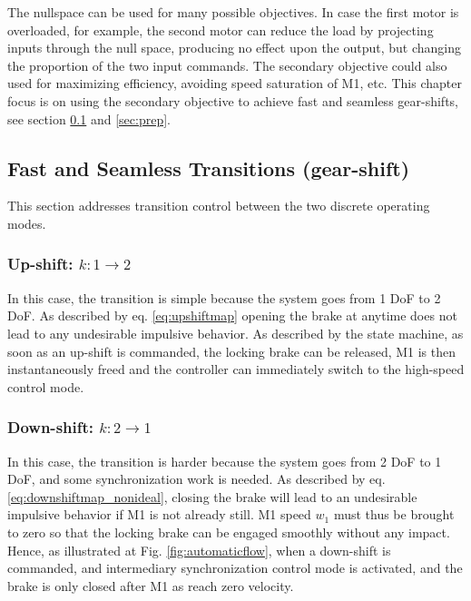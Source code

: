 The nullspace can be used for many possible objectives. In case the first motor is overloaded, for example, the second motor can reduce the load by projecting inputs through the null space, producing no effect upon the output, but changing the proportion of the two input commands. The secondary objective could also used for maximizing efficiency, avoiding speed saturation of M1, etc. This chapter focus is on using the secondary objective to achieve fast and seamless gear-shifts, see section \ref{sec:fastshifts} and \ref{sec:prep}.



\subsection{Fast and Seamless Transitions (gear-shift)}
\label{sec:fastshifts}

This section addresses transition control between the two discrete operating modes.


\subsubsection{Up-shift: $k:1\rightarrow2$}
In this case, the transition is simple because the system goes from 1 DoF to 2 DoF. As described by eq. \eqref{eq:upshiftmap} opening the brake at anytime does not lead to any undesirable impulsive behavior. As described by the state machine, as soon as an up-shift is commanded, the locking brake can be released, M1 is then instantaneously freed and the controller can immediately switch to the high-speed control mode.
%

\subsubsection{Down-shift: $k:2\rightarrow1$}
In this case, the transition is harder because the system goes from 2 DoF to 1 DoF, and some synchronization work is needed. As described by eq. \eqref{eq:downshiftmap_nonideal}, closing the brake will lead to an undesirable impulsive behavior if M1 is not already still. M1 speed $w_1$ must thus be brought to zero so that the locking brake can be engaged smoothly without any impact. Hence, as illustrated at Fig. \ref{fig:automaticflow}, when a down-shift is commanded, and intermediary synchronization control mode is activated, and the brake is only closed after M1 as reach zero velocity. %

